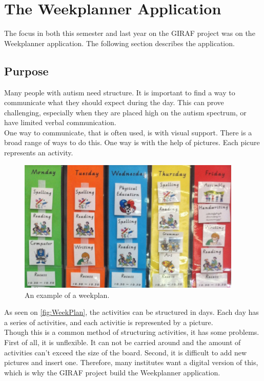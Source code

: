 \section{The Weekplanner Application}

The focus in both this semester and last year on the GIRAF project was on the Weekplanner application. The following section describes the application.\\

\subsection{Purpose}
Many people with autism need structure. It is important to find a way to communicate what they should expect during the day. This can prove challenging, especially when they are placed high on the autism spectrum, or have limited verbal communication.\\
One way to communicate, that is often used, is with visual support\cite{VisualSupport}. There is a broad range of ways to do this. One way is with the help of pictures. Each picure represents an activity.

\begin{figure}[H]
    \begin{center}
        \includegraphics[width=0.95\textwidth]{figures/WeekPlanEks.png}
    \end{center}
    \caption{An example of a weekplan.\cite{VisualSupport}}
    \label{fig:WeekPlan}
\end{figure}

As seen on \autoref{fig:WeekPlan}, the activities can be structured in days. Each day has a series of activities, and each activitie is represented by a picture.\\
Though this is a common method of structuring activities, it has some problems. First of all, it is unflexible. It can not be carried around and the amount of activities can't exceed the size of the board. Second, it is difficult to add new pictures and insert one. 
Therefore, many institutes want a digital version of this, which is why the GIRAF project build the Weekplanner application.\\

